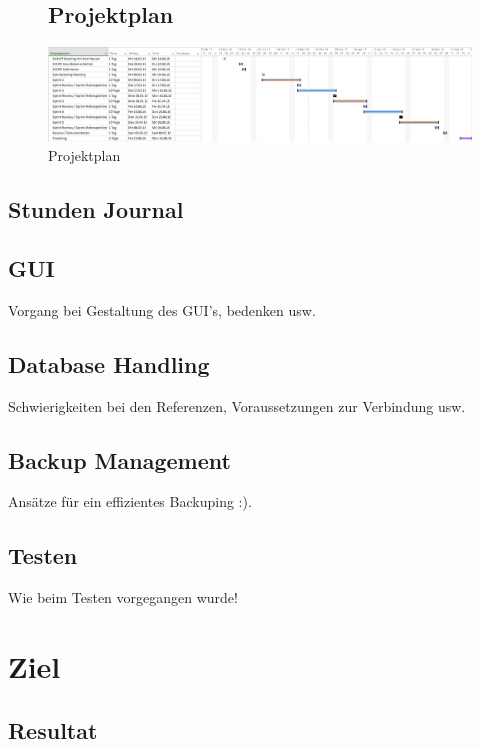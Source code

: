 \documentclass{article}
\begin{document}
\begin{landscape}


\begin{figure}
	\subsection{Projektplan}
	\bigskip
\begin{center}
		\centering
		\includegraphics[width=1.05 \paperwidth]{PJPlanung}
		\caption{Projektplan}
\end{center}
\end{figure}

\end{landscape}
\newpage

\subsection{Stunden Journal}
\subsection{GUI}
Vorgang bei Gestaltung des GUI's, bedenken usw.

\subsection{Database Handling}
Schwierigkeiten bei den Referenzen, Voraussetzungen zur Verbindung usw.

\subsection{Backup Management}
Ansätze für ein effizientes Backuping :).

\subsection{Testen}
Wie beim Testen vorgegangen wurde!

\newpage

\section{Ziel}
\subsection{Resultat}
\end{document}

